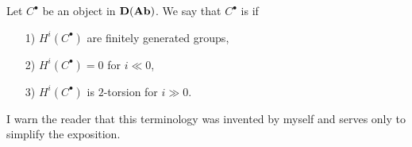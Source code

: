 \begin{definition}
  \label{dfn:almost-perfect-complex} Let $C^\bullet$ be an object in
  $\text{\bf D} (\text{\bf Ab})$. We say that $C^\bullet$ is  if

  \begin{enumerate}
  \item[1)] $H^i (C^\bullet)$ are finitely generated groups,

  \item[2)] $H^i (C^\bullet) = 0$ for $i \ll 0$,

  \item[3)] $H^i (C^\bullet)$ is $2$-torsion for $i \gg 0$.
  \end{enumerate}
\end{definition}

I warn the reader that this terminology was invented by myself and serves only
to simplify the exposition.

